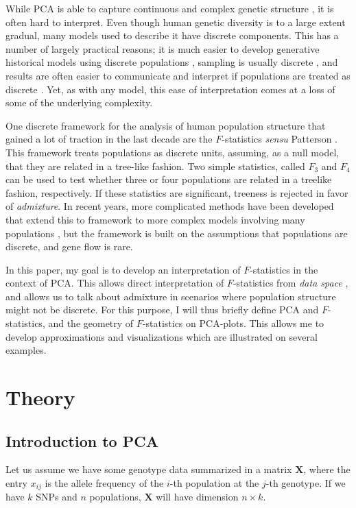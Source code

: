 \documentclass[12pt,a4pape, fullpage]{article}
\newcommand{\MX}{\mathbf{X}} %
\begin{document}
While PCA is able to capture continuous and complex genetic structure \citep{novembre2008, novembre2008a}, it is often hard to interpret. Even though human genetic diversity is to a large extent gradual, many models used to describe it have discrete components. This has a number of largely practical reasons; it is much easier to develop generative historical models using discrete populations \cite{adrion2020}, sampling is usually discrete \cite{mallick2016, thousand_genomes2016}, and results are often easier to communicate and interpret if populations are treated as discrete \citep{popejoy2016}. Yet, as with any model, this ease of interpretation comes at a loss of some of the underlying complexity.

One discrete framework for the analysis of human population structure that gained a lot of traction in the last decade are the $F$-statistics \textit{sensu} Patterson \cite{patterson2012, peter2016}. This framework treats populations as discrete units, assuming, as a null model, that they are related in a tree-like fashion. Two simple statistics, called $F_3$ and $F_4$ can be used to test whether three or four populations are related in a treelike fashion, respectively. If these statistics are significant, treeness is rejected in favor of \emph{admixture}. In recent years, more complicated methods have been developed that extend this to framework to more complex models involving many populations \cite{patterson2012, lipson2013, harney2020}, but the framework is built on the assumptions that populations are discrete, and gene flow is rare. 

In this paper, my goal is to develop an interpretation of $F$-statistics in the context of PCA. This allows direct interpretation of $F$-statistics from \emph{data space} \citep{oteo-garcia2020}, and allows us to talk about admixture in scenarios where population structure might not be discrete. For this purpose, I will thus briefly define PCA and $F$-statistics, and the geometry of $F$-statistics on PCA-plots. This allows me to develop approximations and visualizations which are illustrated on several examples.


\section{Theory}
\subsection{Introduction to PCA}
Let us assume we have some genotype data summarized in a matrix $\MX$, where the entry $x_{ij}$ is the allele frequency of the $i$-th population at the $j$-th genotype. If we have $k$ SNPs and $n$ populations, $\MX$ will have dimension $n \times k$. 
\end{document}

